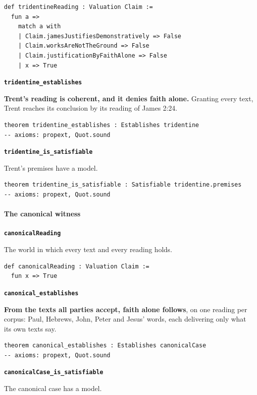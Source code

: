 \documentclass[11pt,paper=\testimonypaper,DIV=13,parskip=false]{scrartcl}
\begin{document}
{\small\begin{verbatim}
def tridentineReading : Valuation Claim :=
  fun a =>
    match a with
    | Claim.jamesJustifiesDemonstratively => False
    | Claim.worksAreNotTheGround => False
    | Claim.justificationByFaithAlone => False
    | x => True
\end{verbatim}}
\par\medskip\noindent\textbf{\texttt{tridentine\_\allowbreak{}establishes}}\par\nobreak\noindent
\textbf{Trent’s reading is coherent, and it denies faith alone.} Granting every text, Trent reaches its conclusion by its reading of James 2:24.

{\small\begin{verbatim}
theorem tridentine_establishes : Establishes tridentine
-- axioms: propext, Quot.sound
\end{verbatim}}
\par\medskip\noindent\textbf{\texttt{tridentine\_\allowbreak{}is\_\allowbreak{}satisfiable}}\par\nobreak\noindent
Trent’s premises have a model.

{\small\begin{verbatim}
theorem tridentine_is_satisfiable : Satisfiable tridentine.premises
-- axioms: propext, Quot.sound
\end{verbatim}}
\paragraph*{The canonical witness}
\leavevmode\par\nobreak
\par\medskip\noindent\textbf{\texttt{canonical\allowbreak{}Reading}}\par\nobreak\noindent
The world in which every text and every reading holds.

{\small\begin{verbatim}
def canonicalReading : Valuation Claim :=
  fun x => True
\end{verbatim}}
\par\medskip\noindent\textbf{\texttt{canonical\_\allowbreak{}establishes}}\par\nobreak\noindent
\textbf{From the texts all parties accept, faith alone follows}, on one reading per corpus: Paul, Hebrews, John, Peter and Jesus’ words, each delivering only what its own texts say.

{\small\begin{verbatim}
theorem canonical_establishes : Establishes canonicalCase
-- axioms: propext, Quot.sound
\end{verbatim}}
\par\medskip\noindent\textbf{\texttt{canonical\allowbreak{}Case\_\allowbreak{}is\_\allowbreak{}satisfiable}}\par\nobreak\noindent
The canonical case has a model.
\end{document}
